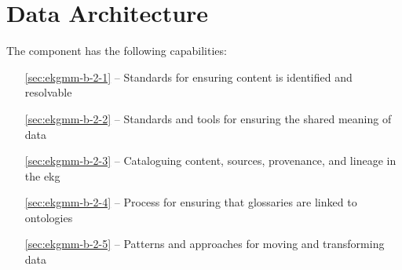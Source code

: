 \chapter{Data Architecture}\label{ch:ekgmm-b-2} %

The  component has the following capabilities:

\begin{itemize}[leftmargin=.5in]
  \item [\ref{sec:ekgmm-b-2-1}]  -- Standards for ensuring content is identified and resolvable
  \item [\ref{sec:ekgmm-b-2-2}]  -- Standards and tools for ensuring the shared meaning of data
  \item [\ref{sec:ekgmm-b-2-3}]  -- Cataloguing content, sources, provenance, and lineage in the \gls{ekg}
  \item [\ref{sec:ekgmm-b-2-4}]  -- Process for ensuring that glossaries are linked to ontologies
  \item [\ref{sec:ekgmm-b-2-5}]  -- Patterns and approaches for moving and transforming data
\end{itemize}








